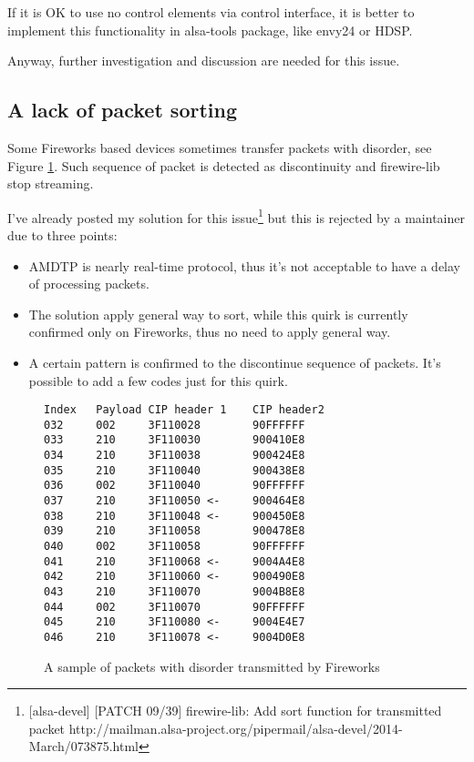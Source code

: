 \documentclass[onecolumn]{article}
\begin{document}
If it is OK to use no control elements via control interface, it is better to implement this functionality in alsa-tools package, like envy24 or HDSP. 

Anyway, further investigation and discussion are needed for this issue.


\subsection{A lack of packet sorting}
Some Fireworks based devices sometimes transfer packets with disorder, see Figure \ref{fireworks-disorder}. Such sequence of packet is detected as discontinuity and firewire-lib stop streaming.

I've already posted my solution for this issue\footnote{[alsa-devel] [PATCH 09/39] firewire-lib: Add sort function for transmitted packet http://mailman.alsa-project.org/pipermail/alsa-devel/2014-March/073875.html} but this is rejected by a maintainer due to three points:
\begin{itemize}
\item AMDTP is nearly real-time protocol, thus it's not acceptable to have a delay of processing packets.
\item The solution apply general way to sort, while this quirk is currently confirmed only on Fireworks, thus no need to apply general way.
\item A certain pattern is confirmed to the discontinue sequence of packets. It's possible to add a few codes just for this quirk.
\end{itemize}

\begin{figure}[htbp]
\small
\begin{verbatim}
Index   Payload CIP header 1    CIP header2
032     002     3F110028        90FFFFFF
033     210     3F110030        900410E8
034     210     3F110038        900424E8
035     210     3F110040        900438E8
036     002     3F110040        90FFFFFF
037     210     3F110050 <-     900464E8
038     210     3F110048 <-     900450E8
039     210     3F110058        900478E8
040     002     3F110058        90FFFFFF
041     210     3F110068 <-     9004A4E8
042     210     3F110060 <-     900490E8
043     210     3F110070        9004B8E8
044     002     3F110070        90FFFFFF
045     210     3F110080 <-     9004E4E7
046     210     3F110078 <-     9004D0E8
\end{verbatim}
\caption{A sample of packets with disorder transmitted by Fireworks}
\label{fireworks-disorder}
\end{figure}
\end{document}

